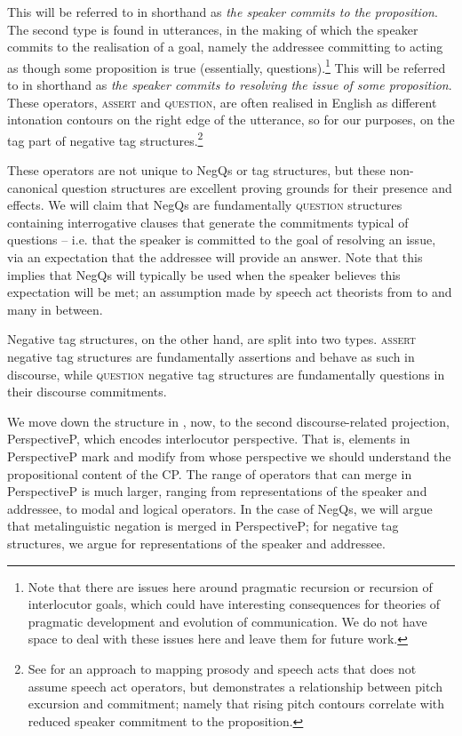 \documentclass[output=paper,colorlinks,citecolor=brown]{langscibook}
\begin{document}
This will be referred to in shorthand as \textit{the speaker commits to the proposition}. The second type is found in utterances, in the making of which the speaker commits to the realisation of a goal, namely the addressee committing to acting as though some proposition is true (essentially, questions).\footnote{Note that there are issues here around pragmatic recursion or recursion of interlocutor goals, which could have interesting consequences for theories of pragmatic development and evolution of communication. We do not have space to deal with these issues here and leave them for future work.} This will be referred to in shorthand as \textit{the speaker commits to resolving the issue of some proposition}. These operators, \textsc{assert} and \textsc{question}, are often realised in English as different intonation contours on the right edge of the utterance, so for our purposes, on the tag part of negative tag structures.\footnote{See \citet{Heim2019} for an approach to mapping prosody and speech acts that does not assume speech act operators, but demonstrates a relationship between pitch excursion and commitment; namely that rising pitch contours correlate with reduced speaker commitment to the proposition.} 

These operators are not unique to NegQs or tag structures, but these non-canonical question structures are excellent proving grounds for their presence and effects. We will claim that NegQs are fundamentally \textsc{question} structures containing interrogative clauses that generate the commitments typical of questions – i.e. that the speaker is committed to the goal of resolving an issue, via an expectation that the addressee will provide an answer. Note that this implies that NegQs will typically be used when the speaker believes this expectation will be met; an assumption made by speech act theorists from \citet{searle1969} to \citet{farkas2022} and many in between. 

Negative tag structures, on the other hand, are split into two types. \textsc{assert} negative tag structures are fundamentally assertions and behave as such in discourse, while \textsc{question} negative tag structures are fundamentally questions in their discourse commitments.

We move down the structure in , now, to the second discourse-related projection, PerspectiveP, which encodes interlocutor perspective. That is, elements in PerspectiveP mark and modify from whose perspective we should understand the propositional
content of the CP. The range of operators that can merge in PerspectiveP is much larger, ranging from representations of the speaker and addressee, to modal and logical operators. In the case of NegQs, we will argue that metalinguistic negation is merged in PerspectiveP; for negative tag structures, we argue for representations of the speaker and addressee. 
\end{document}
